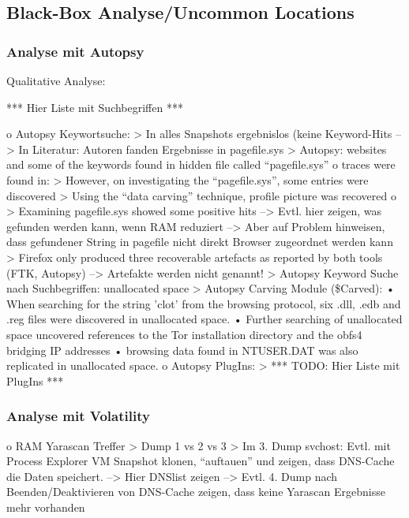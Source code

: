 \subsection*{Black-Box Analyse/Uncommon Locations}

\subsubsection*{Analyse mit Autopsy}
Qualitative Analyse:

*** Hier Liste mit Suchbegriffen ***

	o	Autopsy Keywortsuche: 
		>	In alles Snapshots ergebnislos (keine Keyword-Hits
		-->	In Literatur: Autoren fanden Ergebnisse in pagefile.sys 
			> Autopsy: websites and some of the keywords found in hidden file called “pagefile.sys” \cite{Mahlous.2020}
			o \cite{Montasari.2015} traces were found in: 
				> However, on investigating the “pagefile.sys”, some entries were discovered
				> Using the “data carving” technique, profile picture was recovered
			o \cite{Said.2011} 
				> Examining pagefile.sys showed some positive hits 			
		--> Evtl. hier zeigen, was gefunden werden kann, wenn RAM reduziert
		--> Aber auf Problem hinweisen, dass gefundener String in pagefile nicht direkt Browser zugeordnet werden kann
		> \cite{Gabet.2018}	Firefox only produced three recoverable artefacts as reported by both tools (FTK, Autopsy) --> Artefakte werden nicht genannt!
		> \cite{Muir.2019} Autopsy Keyword Suche nach Suchbegriffen: unallocated space
		> Autopsy Carving Module (\$Carved): \cite{Muir.2019}
			•	When searching for the string ’clot’ from the browsing protocol, six .dll, .edb and .reg files were discovered in unallocated space.
			•	Further searching of unallocated space uncovered references to the Tor installation directory and the obfs4 bridging IP addresses
			•	browsing data found in NTUSER.DAT was also replicated in unallocated space.
	o	Autopsy PlugIns:
		>	*** TODO: Hier Liste mit PlugIns ***

\subsubsection*{Analyse mit Volatility}
o	RAM Yarascan Treffer
	>	Dump 1 vs 2 vs 3 
	>	Im 3. Dump svchost: Evtl. mit Process Explorer VM Snapshot klonen, “auftauen” und zeigen, dass DNS-Cache die Daten speichert. 
	-->	Hier DNSlist zeigen
	-->	Evtl. 4. Dump nach Beenden/Deaktivieren von DNS-Cache zeigen, dass keine Yarascan Ergebnisse mehr vorhanden

